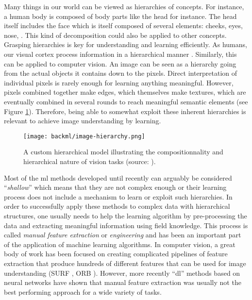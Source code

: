 Many things in our world can be viewed as hierarchies of concepts. For instance,
a human body is composed of body parts like the head for instance. The head itself
includes the face which is itself composed of several elements: cheeks, eyes,
nose, \etc. This kind of decomposition could also be applied to other concepts.
Grasping hierarchies is key for understanding and learning efficiently. As humans,
our visual cortex process information in a hierarchical manner \parencite{van1994neural}.
Similarly, this can be applied to computer vision. An image can be seen as a
hierarchy going from the actual objects it contains down to the pixels. Direct
interpretation of individual pixels is rarely enough for learning anything
meaningful. However, pixels combined together make edges, which themselves make
textures, which are eventually combined in several rounds to reach meaningful
semantic elements (see Figure \ref{fig:backml:hierarchy}). Therefore, being able
to somewhat exploit these inherent hierarchies is relevant to achieve image
understanding by learning.

\begin{figure}
  \centering
  \texttt{[image: backml/image-hierarchy.png]}
  \caption{A custom hierarchical model illustrating the compositionnality and hierarchical nature of vision tasks (source: \parencite{leonardis2010learning}).}
  \label{fig:backml:hierarchy}
\end{figure}

Most of the \acrlong{ml} methods developed until recently can arguably be considered
``\textit{shallow}'' which means that they are not complex enough or their learning
process does not include a mechanism to learn or exploit such hierarchies. In
order to successfully apply these methods to complex data with hierarchical
structures, one usually needs to help the learning algorithm by pre-processing
the data and extracting meaningful information using field knowledge. This process
is called \textit{manual feature extraction} or \textit{engineering} and has been
an important part of the application of machine learning algorithms. In computer
vision, a great body of work has been focused on creating complicated pipelines
of feature extraction that produce hundreds of different features that can be used
for image understanding (\eg SURF \parencite{bay2006surf}, ORB \parencite{rublee2011orb}).
However, more recently ``\acrlong{dl}'' methods based on neural networks have
shown that manual feature extraction was usually not the best performing approach
for a wide variety of tasks.

